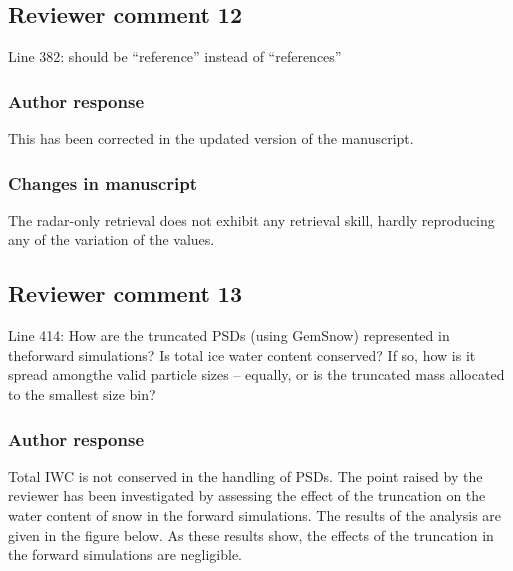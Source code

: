 
\subsection*{Reviewer comment 12}

 Line 382: should be “reference” instead of “references”

\subsubsection*{Author response}
This has been corrected in the updated version of the manuscript.

\subsubsection*{Changes in manuscript}
 \begin{change}[382]
The radar-only retrieval does not
exhibit any retrieval skill, hardly reproducing any of the variation of the
\DIFdelbegin {}\DIFdelend \DIFaddbegin {}\DIFaddend values.
 \end{change}

\subsection*{Reviewer comment 13}

Line  414:  How  are  the  truncated  PSDs  (using  GemSnow)  represented  in  theforward simulations? Is total ice water content conserved? If so, how is it spread amongthe valid particle sizes – equally, or is the truncated mass allocated to the smallest size bin?

\subsubsection*{Author response}

Total IWC is not conserved in the handling of PSDs. The point raised by the reviewer has been
investigated by assessing the effect of the truncation on the water content of snow in the
forward simulations. The results of the analysis are given in the figure below. As these results
show, the effects of the truncation in the forward simulations are negligible.

